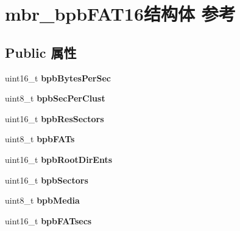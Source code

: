 \hypertarget{structmbr__bpb_f_a_t16}{}\section{mbr\+\_\+bpb\+F\+A\+T16结构体 参考}
\label{structmbr__bpb_f_a_t16}
\subsection*{Public 属性}
\begin{DoxyCompactItemize}
\item 
\mbox{\label{structmbr__bpb_f_a_t16_a0caeeecac92ba27e8734f6d538067f5f}} 
uint16\+\_\+t {\bfseries bpb\+Bytes\+Per\+Sec}
\item 
\mbox{\label{structmbr__bpb_f_a_t16_a8db5cd0b4caf9cac2aee058c21dca52c}} 
uint8\+\_\+t {\bfseries bpb\+Sec\+Per\+Clust}
\item 
\mbox{\label{structmbr__bpb_f_a_t16_a58430d0bdd9b5ffefe9ea7a9b0a492c9}} 
uint16\+\_\+t {\bfseries bpb\+Res\+Sectors}
\item 
\mbox{\label{structmbr__bpb_f_a_t16_a058d52a0357bd394fff88bc98b7fb157}} 
uint8\+\_\+t {\bfseries bpb\+F\+A\+Ts}
\item 
\mbox{\label{structmbr__bpb_f_a_t16_ab726fb8c4711052cbb3a2657399d8da3}} 
uint16\+\_\+t {\bfseries bpb\+Root\+Dir\+Ents}
\item 
\mbox{\label{structmbr__bpb_f_a_t16_a92516d12636d6c7e031df2e077f64f50}} 
uint16\+\_\+t {\bfseries bpb\+Sectors}
\item 
\mbox{\label{structmbr__bpb_f_a_t16_aebfddfad01a6f8296766bd550f1183d1}} 
uint8\+\_\+t {\bfseries bpb\+Media}
\item 
\mbox{\label{structmbr__bpb_f_a_t16_a6223327a4e9a8e396a38d79ce144015a}} 
uint16\+\_\+t {\bfseries bpb\+F\+A\+Tsecs}
\item 
\mbox{\label{structmbr__bpb_f_a_t16_a06785a6635e64fc1e94f3a6b4fb0f603}} 

\end{DoxyCompactItemize}
